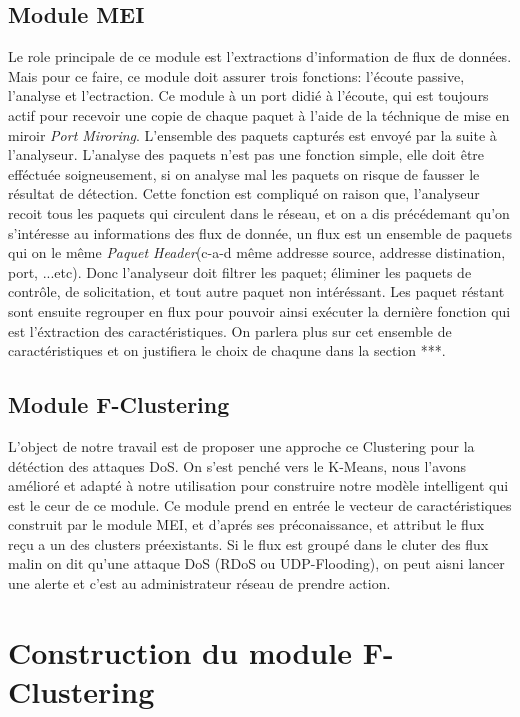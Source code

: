 \newpage
\subsection{Module MEI}
Le role principale de ce module est l'extractions d'information de flux de données. Mais pour ce faire, ce module doit assurer trois fonctions: l'écoute passive, l'analyse et l'ectraction. Ce module à un port didié à l'écoute, qui est toujours actif pour recevoir une copie de chaque paquet à l'aide de la téchnique de mise en miroir \textit{Port Miroring}. L'ensemble des paquets capturés est envoyé par la suite à l'analyseur. L'analyse des paquets n'est pas une fonction simple, elle doit être efféctuée soigneusement, si on analyse mal les paquets on risque de fausser le résultat de détection. Cette fonction est compliqué on raison que, l'analyseur recoit tous les paquets qui circulent dans le réseau, et on a dis précédemant qu'on s'intéresse au informations des flux de donnée, un flux est un ensemble de paquets qui on le même \textit{Paquet Header}(c-a-d même addresse source, addresse distination, port, ...etc). Donc l'analyseur doit filtrer les paquet; éliminer les paquets de contrôle, de solicitation, et tout autre paquet non intéréssant. Les paquet réstant sont ensuite regrouper en flux pour pouvoir ainsi exécuter la dernière fonction qui est l'éxtraction des caractéristiques. On parlera plus sur cet ensemble de caractéristiques et on justifiera le choix de chaqune dans la section ***.

\subsection{Module F-Clustering}
L'object de notre travail est de proposer une approche ce Clustering pour la détéction des attaques DoS. On s'est penché vers le K-Means, nous l'avons amélioré et adapté à notre utilisation pour construire notre modèle intelligent qui est le ceur de ce module. Ce module prend en entrée le vecteur de caractéristiques construit par le module MEI, et d'aprés ses préconaissance, et attribut le flux reçu a un des clusters préexistants. Si le flux est groupé dans le cluter des flux malin on dit qu'une attaque DoS (RDoS ou UDP-Flooding), on peut aisni lancer une alerte et c'est au administrateur réseau de prendre action.

\section{Construction du module F-Clustering}



